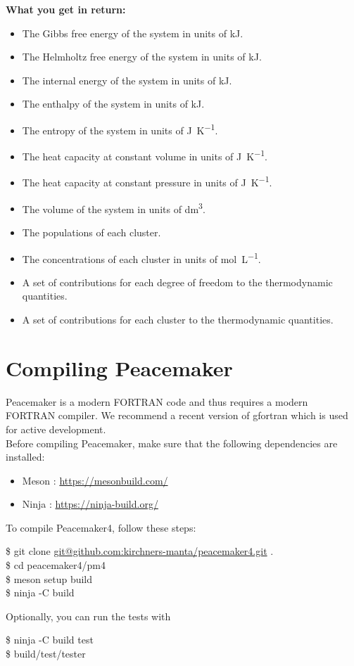 \documentclass{scrartcl}
\begin{document}
\textbf{What you get in return:}\vspace{-0.2cm}
\begin{itemize}[noitemsep]
    \item The Gibbs free energy of the system in units of \si{\kilo\joule}.
    \item The Helmholtz free energy of the system in units of \si{\kilo\joule}.
    \item The internal energy of the system in units of \si{\kilo\joule}.
    \item The enthalpy of the system in units of \si{\kilo\joule}.
    \item The entropy of the system in units of \si{\joule\per\kelvin}.
    \item The heat capacity at constant volume in units of \si{\joule\per\kelvin}.
    \item The heat capacity at constant pressure in units of \si{\joule\per\kelvin}.
    \item The volume of the system in units of \si{\deci\meter\cubed}.
    \item The populations of each cluster.
    \item The concentrations of each cluster in units of \si{\mole\per\liter}.
    \item A set of contributions for each degree of freedom to the thermodynamic quantities.
    \item A set of contributions for each cluster to the thermodynamic quantities.
\end{itemize}

\section{Compiling Peacemaker}

Peacemaker is a modern FORTRAN code and thus requires a modern FORTRAN compiler.
We recommend a recent version of gfortran which is used for active development. \\
Before compiling Peacemaker, make sure that the following dependencies are installed:
\begin{itemize}
    \item Meson : \url{https://mesonbuild.com/}
    \item Ninja : \url{https://ninja-build.org/}
\end{itemize}
To compile Peacemaker4, follow these steps:
\begin{addmargin}[1cm]{0cm}
    \ttfamily
    \$ git clone
    \url{git@github.com:kirchners-manta/peacemaker4.git} .\\
    \$ cd peacemaker4/pm4 \\
    \$ meson setup build \\
    \$ ninja -C build 
\end{addmargin}
Optionally, you can run the tests with
\begin{addmargin}[1cm]{0cm}
    \ttfamily
    \$ ninja -C build test \\
    \$ build/test/tester
\end{addmargin}
\end{document}
